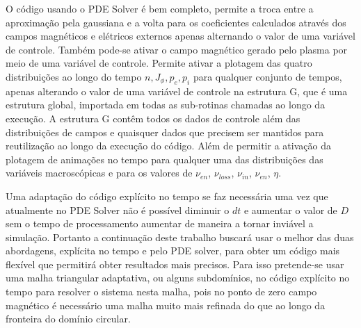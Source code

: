 \documentclass[12pt,oneside,a4paper]{abntex2}
\begin{document}
O código usando o PDE Solver é bem completo, permite a troca entre a aproximação pela gaussiana e a volta para os coeficientes calculados através dos campos magnéticos e elétricos externos apenas alternando o valor de uma variável de controle. Também pode-se ativar o campo magnético gerado pelo plasma por meio de uma variável de controle. Permite ativar a plotagem das quatro distribuições ao longo do tempo $n, J_\phi, p_e, p_i$ para qualquer conjunto de tempos, apenas alterando o valor de uma variável de controle na estrutura G, que é uma estrutura global, importada em todas as sub-rotinas chamadas ao longo da execução. A estrutura G contêm todos os dados de controle além das distribuições de campos e quaisquer dados que precisem ser mantidos para reutilização ao longo da execução do código. Além de permitir a ativação da plotagem de animações no tempo para qualquer uma das distribuições das variáveis macroscópicas e para os valores de $\nu_{en}$, $\nu_{loss}$, $\nu_{in}$, $\nu_{en}$, $\eta$.

Uma adaptação do código explícito no tempo se faz necessária uma vez que atualmente no PDE Solver não é possível diminuir o $dt$ e aumentar o valor de $D$ sem o tempo de processamento aumentar de maneira a tornar inviável a simulação. Portanto a continuação deste trabalho buscará usar o melhor das duas abordagens, explícita no tempo e pelo PDE solver, para obter um código mais flexível que permitirá obter resultados mais precisos. Para isso pretende-se usar uma malha triangular adaptativa, ou alguns subdomínios, no código explícito no tempo para resolver o sistema nesta malha, pois no ponto de zero campo magnético é necessário uma malha muito mais refinada do que ao longo da fronteira do domínio circular. 




\appendix  
\end{document}
